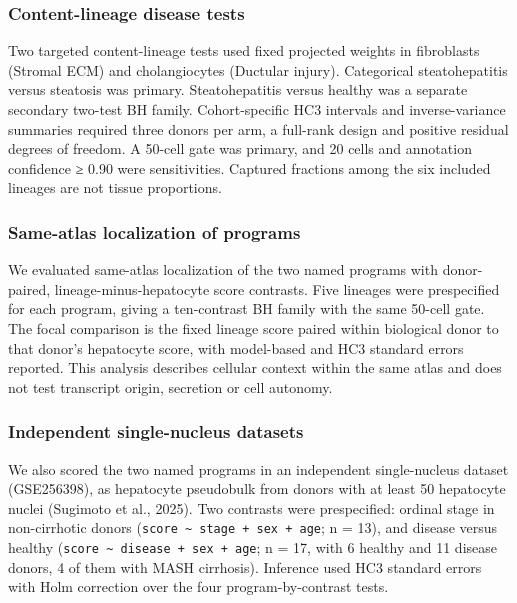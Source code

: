 \subsubsection{Content-lineage disease tests}\label{content-lineage-disease-tests}

Two targeted content-lineage tests used fixed projected weights in fibroblasts (Stromal ECM) and cholangiocytes (Ductular injury). Categorical steatohepatitis versus steatosis was primary. Steatohepatitis versus healthy was a separate secondary two-test BH family. Cohort-specific HC3 intervals and inverse-variance summaries required three donors per arm, a full-rank design and positive residual degrees of freedom. A 50-cell gate was primary, and 20 cells and annotation confidence ≥ 0.90 were sensitivities. Captured fractions among the six included lineages are not tissue proportions.

\subsubsection{Same-atlas localization of programs}\label{same-atlas-localization-of-programs}

We evaluated same-atlas localization of the two named programs with donor-paired, lineage-minus-hepatocyte score contrasts. Five lineages were prespecified for each program, giving a ten-contrast BH family with the same 50-cell gate. The focal comparison is the fixed lineage score paired within biological donor to that donor's hepatocyte score, with model-based and HC3 standard errors reported. This analysis describes cellular context within the same atlas and does not test transcript origin, secretion or cell autonomy.

\subsubsection{Independent single-nucleus datasets}\label{independent-single-nucleus-datasets}

We also scored the two named programs in an independent single-nucleus dataset (GSE256398), as hepatocyte pseudobulk from donors with at least 50 hepatocyte nuclei (Sugimoto et al., 2025). Two contrasts were prespecified: ordinal stage in non-cirrhotic donors (\texttt{score\ \textasciitilde{}\ stage\ +\ sex\ +\ age}; n = 13), and disease versus healthy (\texttt{score\ \textasciitilde{}\ disease\ +\ sex\ +\ age}; n = 17, with 6 healthy and 11 disease donors, 4 of them with MASH cirrhosis). Inference used HC3 standard errors with Holm correction over the four program-by-contrast tests.

